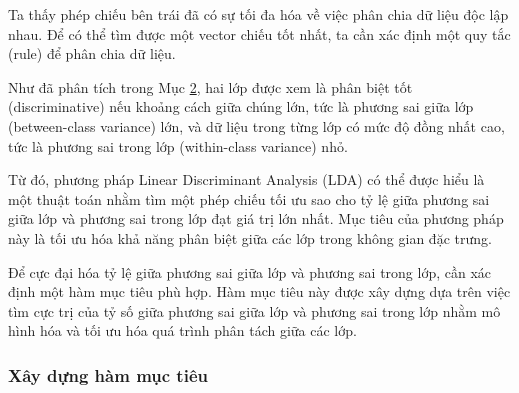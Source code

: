 \documentclass[
  a4paper,
]{article}
\begin{document}
Ta thấy phép chiếu bên trái đã có sự tối đa hóa về việc phân chia dữ
liệu độc lập nhau. Để có thể tìm được một vector chiếu tốt nhất, ta cần
xác định một quy tắc (rule) để phân chia dữ liệu.

Như đã phân tích trong Mục \href{}{2}, hai lớp được xem là phân biệt tốt
(discriminative) nếu khoảng cách giữa chúng lớn, tức là phương sai giữa
lớp (between-class variance) lớn, và dữ liệu trong từng lớp có mức độ
đồng nhất cao, tức là phương sai trong lớp (within-class variance) nhỏ.

Từ đó, phương pháp Linear Discriminant Analysis (LDA) có thể được hiểu
là một thuật toán nhằm tìm một phép chiếu tối ưu sao cho tỷ lệ giữa
phương sai giữa lớp và phương sai trong lớp đạt giá trị lớn nhất. Mục
tiêu của phương pháp này là tối ưu hóa khả năng phân biệt giữa các lớp
trong không gian đặc trưng.

Để cực đại hóa tỷ lệ giữa phương sai giữa lớp và phương sai trong lớp,
cần xác định một hàm mục tiêu phù hợp. Hàm mục tiêu này được xây dựng
dựa trên việc tìm cực trị của tỷ số giữa phương sai giữa lớp và phương
sai trong lớp nhằm mô hình hóa và tối ưu hóa quá trình phân tách giữa
các lớp.

\subsubsection{Xây dựng hàm mục
tiêu}\label{xuxe2y-dux1ef1ng-huxe0m-mux1ee5c-tiuxeau}
\end{document}
